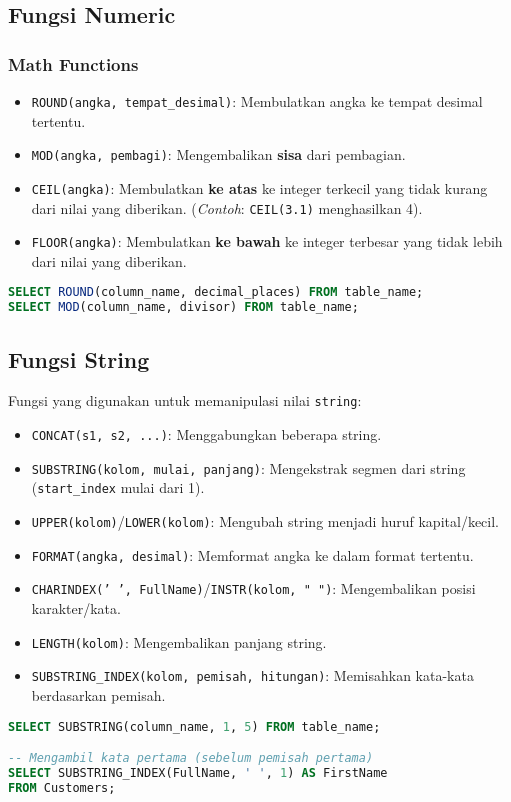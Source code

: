 \documentclass{article}
\begin{document}
\subsection{Fungsi Numeric}

\subsubsection{Math Functions}
\begin{itemize}
    \item \texttt{ROUND(angka, tempat\_desimal)}: Membulatkan angka ke tempat desimal tertentu.
    \item \texttt{MOD(angka, pembagi)}: Mengembalikan \textbf{sisa} dari pembagian.
    \item \texttt{CEIL(angka)}: Membulatkan \textbf{ke atas} ke integer terkecil yang tidak kurang dari nilai yang diberikan. (\textit{Contoh}: \texttt{CEIL(3.1)} menghasilkan 4).
    \item \texttt{FLOOR(angka)}: Membulatkan \textbf{ke bawah} ke integer terbesar yang tidak lebih dari nilai yang diberikan.
\end{itemize}
\begin{lstlisting}[language=SQL, caption={Contoh ROUND dan MOD}, captionpos=b]
SELECT ROUND(column_name, decimal_places) FROM table_name;
SELECT MOD(column_name, divisor) FROM table_name;
\end{lstlisting}

\subsection{Fungsi String}
Fungsi yang digunakan untuk memanipulasi nilai \texttt{string}:
\begin{itemize}
    \item \texttt{CONCAT(s1, s2, ...)}: Menggabungkan beberapa string.
    \item \texttt{SUBSTRING(kolom, mulai, panjang)}: Mengekstrak segmen dari string (\texttt{start\_index} mulai dari 1).
    \item \texttt{UPPER(kolom)}/\texttt{LOWER(kolom)}: Mengubah string menjadi huruf kapital/kecil.
    \item \texttt{FORMAT(angka, desimal)}: Memformat angka ke dalam format tertentu.
    \item \texttt{CHARINDEX(' ', FullName)}/\texttt{INSTR(kolom, " ")}: Mengembalikan posisi karakter/kata.
    \item \texttt{LENGTH(kolom)}: Mengembalikan panjang string.
    \item \texttt{SUBSTRING\_INDEX(kolom, pemisah, hitungan)}: Memisahkan kata-kata berdasarkan pemisah.
\end{itemize}
\begin{lstlisting}[language=SQL, caption={Contoh SUBSTRING dan SUBSTRING\_INDEX}, captionpos=b]
SELECT SUBSTRING(column_name, 1, 5) FROM table_name;

-- Mengambil kata pertama (sebelum pemisah pertama)
SELECT SUBSTRING_INDEX(FullName, ' ', 1) AS FirstName  
FROM Customers;
\end{lstlisting}
\end{document}

